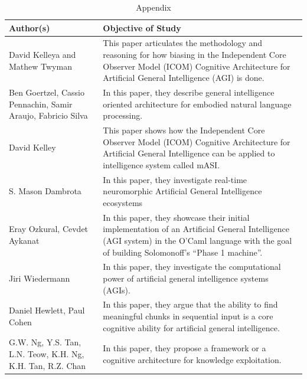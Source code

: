 \documentclass{article}
\begin{document}
    

\begin{table}
    \caption{Appendix}
    \centering

    \renewcommand{\arraystretch}{3}
    
    \begin{tabular}{ |p{5cm}|p{10cm}|  }
    \hline
    Author(s) & Objective of Study\\
    \hline
    
    David Kelleya and Mathew Twyman & This paper articulates the methodology and reasoning for how biasing in the Independent Core Observer Model (ICOM) Cognitive Architecture for Artificial General Intelligence (AGI) is done. \\

    Ben Goertzel, Cassio Pennachin, Samir Araujo, Fabricio Silva & In this paper, they describe general intelligence oriented architecture for embodied natural language processing. \\

    David Kelley & This paper shows how the Independent Core Observer Model (ICOM) Cognitive Architecture for Artificial General Intelligence can be applied to intelligence system called mASI. \\

    S. Mason Dambrota & In this paper, they investigate real-time neuromorphic Artificial General Intelligence ecosystems \\

    Eray Ozkural, Cevdet Aykanat & In this paper, they showcase their initial implementation of an Artificial General Intelligence (AGI system) in the O’Caml language with the goal of building Solomonoff’s “Phase 1 machine”.\\

    Jiri Wiedermann & In this paper, they investigate the computational power of artificial general intelligence systems (AGIs). \\

    Daniel Hewlett, Paul Cohen & In this paper, they argue that the ability to find meaningful chunks in sequential input is a core cognitive ability for artificial general intelligence. \\

    G.W. Ng, Y.S. Tan, L.N. Teow, K.H. Ng, K.H. Tan, R.Z. Chan & In this paper, they propose a framework or a cognitive architecture for knowledge exploitation. \\


    \hline
    \end{tabular}
\end{table}

    
    
\end{document}
